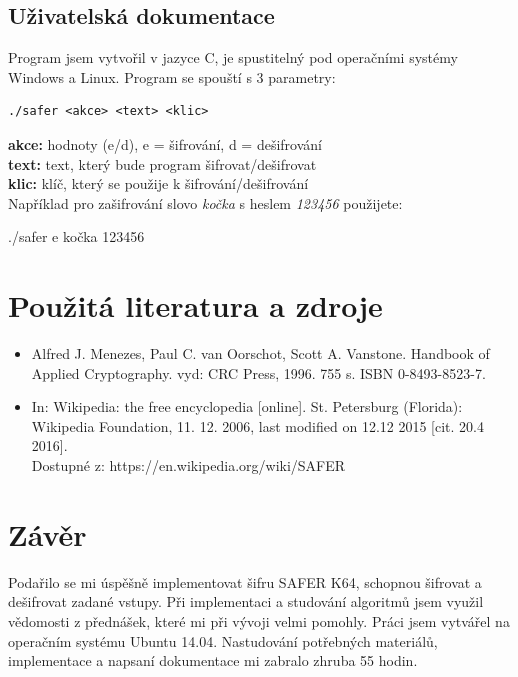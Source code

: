 \documentclass[12pt,a4paper]{article}
\let\oldsection\section
\renewcommand\section{\clearpage\oldsection}
\begin{document}
{\subsection{Uživatelská dokumentace}}

Program jsem vytvořil v jazyce C, je spustitelný pod operačními systémy Windows a Linux. Program se spouští s 3 parametry:
\lstset{language=C} 
\begin{lstlisting}[frame=single]
 ./safer <akce> <text> <klic>
\end{lstlisting}
\textbf{akce:} hodnoty (e/d), e = šifrování, d = dešifrování\\
\textbf{text:} text, který bude program šifrovat/dešifrovat\\
\textbf{klic:} klíč, který se použije k šifrování/dešifrování\\

Například pro zašifrování slovo \emph{kočka} s heslem \emph{123456} použijete:
\begin{center}
 ./safer e kočka 123456
\end{center}

{\section{Použitá literatura a zdroje}}
\begin{itemize}

\item Alfred J. Menezes, Paul C. van Oorschot, Scott A. Vanstone. Handbook of Applied Cryptography. vyd: CRC Press, 1996. 755 s. ISBN 0-8493-8523-7.

\item In: Wikipedia: the free encyclopedia [online]. St. Petersburg (Florida): Wikipedia Foundation, 11. 12. 2006, last modified on 12.12 2015 [cit. 20.4 2016]. \\Dostupné z: https://en.wikipedia.org/wiki/SAFER


\end{itemize}
{\section{Závěr}}
Podařilo se mi úspěšně implementovat šifru SAFER K64, schopnou šifrovat a dešifrovat zadané vstupy. Při implementaci a studování algoritmů jsem využil vědomosti z přednášek, které mi při vývoji velmi pomohly. Práci jsem vytvářel na operačním systému Ubuntu 14.04. Nastudování potřebných materiálů, implementace a napsaní dokumentace mi zabralo zhruba 55 hodin.
\end{document}
